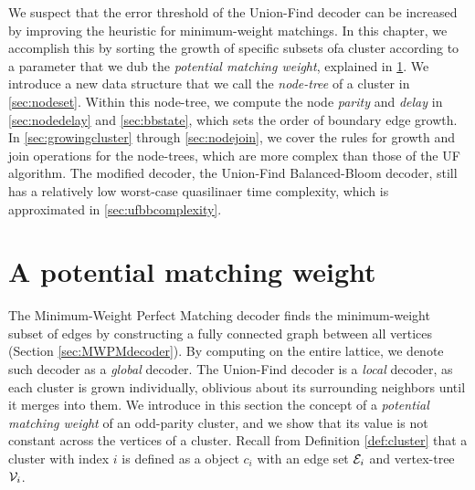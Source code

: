 We suspect that the error threshold of the Union-Find decoder can be increased by improving the heuristic for minimum-weight matchings. In this chapter, we accomplish this by sorting the growth of specific subsets ofa cluster according to a parameter that we dub the \emph{potential matching weight}, explained in \ref{sec:PMW}. We introduce a new data structure that we call the \emph{node-tree} of a cluster in \ref{sec:nodeset}. Within this node-tree, we compute the node \emph{parity} and \emph{delay} in \ref{sec:nodedelay} and \ref{sec:bbstate}, which sets the order of boundary edge growth. In \ref{sec:growingcluster} through \ref{sec:nodejoin}, we cover the rules for growth and join operations for the node-trees, which are more complex than those of the UF algorithm. The modified decoder, the Union-Find Balanced-Bloom decoder, still has a relatively low worst-case quasilinaer time complexity, which is approximated in \ref{sec:ufbbcomplexity}. 

\section{A potential matching weight}\label{sec:PMW}

The Minimum-Weight Perfect Matching decoder finds the minimum-weight subset of edges by constructing a fully connected graph between all vertices (Section \ref{sec:MWPMdecoder}). By computing on the entire lattice, we denote such decoder as a \emph{global} decoder. The Union-Find decoder is a \emph{local} decoder, as each cluster is grown individually, oblivious about its surrounding neighbors until it merges into them. We introduce in this section the concept of a \emph{potential matching weight} of an odd-parity cluster, and we show that its value is not constant across the vertices of a cluster. Recall from Definition \ref{def:cluster} that a cluster with index $i$ is defined as a object $c_i$ with an edge set $\mathcal{E}_i$ and vertex-tree $\mathcal{V}_i$.

